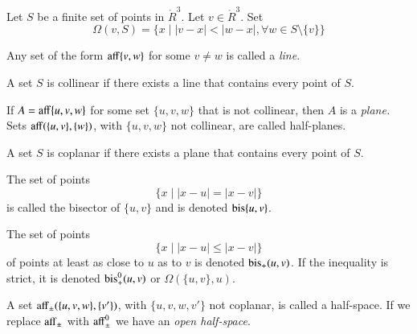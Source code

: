 \begin{definition} 
Let $S$ be a finite set of points in 
$\ring{R}^3$.  Let $v\in\ring{R}^3$. Set
  $$
  \Omega(v,S) = \{x \mid |v-x| < |w-x|, \forall w\in S\setminus\{v\}\}
  $$
\end{definition}
	
\begin{definition}[line]
Any set of the form ${\operatorname{aff}}\{v,w\}$ for some $v\ne w$ is called a 
 {\it line.}
\end{definition}

\begin{definition}[collinear]  
A set $S$ is collinear if there exists
a line that contains every point of $S$.
\end{definition}

\begin{definition}
If $A={\operatorname{aff}}\{u,v,w\}$ for some set $\{u,v,w\}$ that is not collinear,
then $A$ is a {\it plane.}  Sets ${\operatorname{aff}}(\{u,v\},\{w\})$, with
$\{u,v,w\}$ not collinear, are called half-planes.
\end{definition}

\begin{definition}[coplanar]
A set $S$ is  coplanar if there exists
a plane that contains every point of $S$.
\end{definition}

\begin{definition}[bisector]
The set of points 
   $$
   \{ x \mid |x - u | = |x-v|\}
   $$
is called the bisector of $\{u,v\}$ and is denoted
${\operatorname{bis}}\{u,v\}$.
\end{definition}

\begin{definition}[$\op{bis}_+$]
The set of points
   $$
   \{ x \mid |x- u | \le |x-v|\}
   $$
of points at least as close to $u$ as to $v$ is denoted
${\operatorname{bis}}_+(u,v)$.  If the inequality is strict, it is denoted
${\operatorname{bis}}_+^0(u,v)$ or $\Omega(\{u,v\},u)$.
\end{definition}

\begin{definition}
A set ${\operatorname{aff}}_{\pm}(\{u,v,w\},\{v'\})$,
with $\{u,v,w,v'\}$ not coplanar, is called a half-space.  If
we replace ${\operatorname{aff}}_{\pm}$ with ${\operatorname{aff}}_{\pm}^0$ we have an
{\it open half-space}.
\end{definition}






